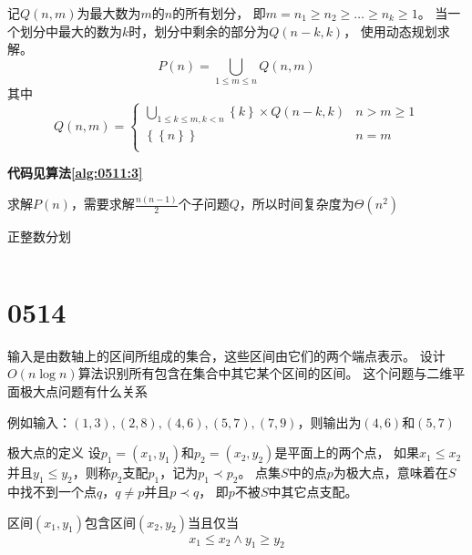 \documentclass[answers]{exam}
\begin{document}
\begin{questions}
    \begin{solution}
        记$Q(n, m)$为最大数为$m$的$n$的所有划分，
        即$m = n_1 \ge n_2 \ge \dots \ge n_k \ge 1$。
        当一个划分中最大的数为$k$时，划分中剩余的部分为$Q(n-k,k)$，
        使用动态规划求解。
        \[
            P(n) = \bigcup_{1 \le m \le n} Q(n, m)
        \]其中
        \[
            Q(n, m) = \begin{cases}
                \bigcup_{1 \le k \le m, k<n} {\left\{ k \right\} \times Q(n-k, k) } & n > m \ge 1 \\
                \left\{ \left\{ n \right\} \right\}                                 & n = m       \\
            \end{cases}
        \]

        \textbf{代码见算法\ref{alg:0511:3}}

        求解$P(n)$，需要求解$\frac{n(n-1)}{2}$个子问题$Q$，所以时间复杂度为$\Theta(n^2)$
    \end{solution}

    \begin{algorithm}[!ht]
        \caption{正整数分划}\label{alg:0511:3}
        \inputminted{python}{alg-0511-03.py}
    \end{algorithm}


    \newpage %
    \section{0514}\label{sec:0514}

    \question 输入是由数轴上的区间所组成的集合，这些区间由它们的两个端点表示。
    设计$O(n \log n)$算法识别所有包含在集合中其它某个区间的区间。
    这个问题与二维平面极大点问题有什么关系

    例如输入：$(1,3), (2,8), (4,6), (5,7), (7,9)$，则输出为$(4,6)$和$(5,7)$

    \begin{solution}


        \textsf{极大点的定义} \quad
        {
            \kaishu
            设$p_1=(x_1,y_1)$和$p_2=(x_2,y_2)$是平面上的两个点，
            如果$x_1 \le x_2$并且$y_1 \le y_2$，则称$p_2$支配$p_1$，记为$p_1 \prec p_2$。
            点集$S$中的点$p$为极大点，意味着在$S$中找不到一个点$q$，$q \ne p$并且$p \prec q$，
            即$p$不被$S$中其它点支配。
        }

        区间$(x_1, y_1)$包含区间$(x_2, y_2)$当且仅当\[
            x_1 \le x_2 \wedge y_1 \ge y_2
        \]


\end{solution}
\end{questions}
\end{document}
